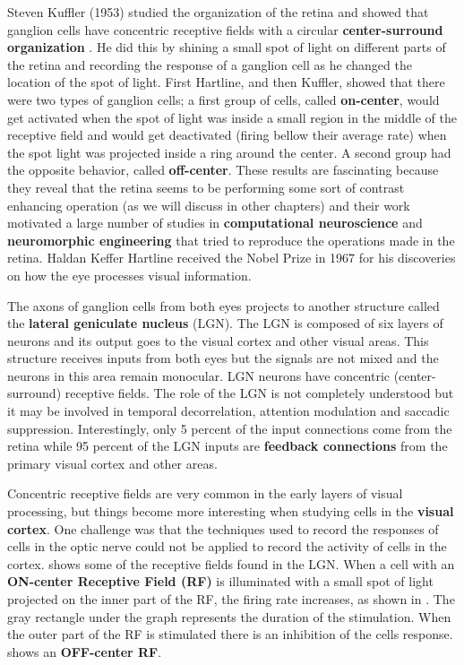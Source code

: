 Steven Kuffler (1953) studied the organization of the retina and showed that ganglion cells have concentric receptive fields with a circular {\bf center-surround organization} \cite{Kuffler1953}. 
He did this by shining a small spot of light on different parts of the retina and recording the response of a ganglion cell as he changed the location of the spot of light. First Hartline, and then Kuffler, showed that there were two types of ganglion cells; a first group of cells, called {\bf on-center}, would get activated when the spot of light was inside a small region in the middle of the receptive field and would get deactivated (firing bellow their average rate) when the spot light was projected inside a ring around the center. 
A second group had the opposite behavior, called {\bf off-center}. These results are fascinating because they reveal that the retina seems to be performing some sort of contrast enhancing operation (as we will discuss in other chapters) and their work motivated a large number of studies in {\bf computational neuroscience} and {\bf neuromorphic engineering} \cite{Mead89} that tried to reproduce the operations made in the retina. Haldan Keffer Hartline received the Nobel Prize in 1967 for his discoveries on how the eye processes visual information. 


The axons of ganglion cells from both eyes projects to another structure called the {\bf lateral geniculate nucleus} (LGN). The LGN is composed of six layers of neurons and its output goes to the visual cortex and other visual areas. This structure receives inputs from both eyes but the signals are not mixed and the neurons in this area remain monocular. LGN neurons have concentric (center-surround) receptive fields. The role of the LGN is not completely understood but it may be involved in temporal decorrelation, attention modulation and saccadic suppression. Interestingly, only 5 percent of the input connections come from the retina while 95 percent of the LGN inputs are {\bf feedback connections} from the primary visual cortex and other areas. 


Concentric receptive fields are very common in the early layers of visual processing, but things become more interesting when studying cells in the {\bf visual cortex}. One challenge was that the techniques used to record the responses of cells in the optic nerve could not be applied to record the activity of cells in the cortex. \Fig{\ref{fig:receptivefields}} shows some of the receptive fields found in the LGN. When a cell with an {\bf ON-center Receptive Field (RF)} is illuminated with a small spot of light projected on the inner part of the RF, the firing rate increases, as shown in . The gray rectangle under the graph represents the duration of the stimulation. When the outer part of the RF is stimulated there is an inhibition of the cells response.  shows an {\bf OFF-center RF}.


